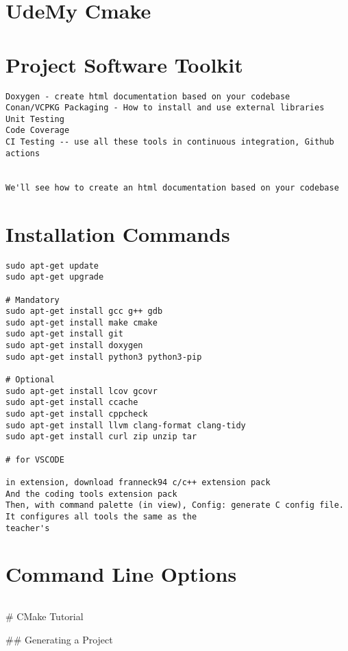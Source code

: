 \section{UdeMy Cmake}

\section{Project Software Toolkit}

\begin{verbatim}
Doxygen - create html documentation based on your codebase
Conan/VCPKG Packaging - How to install and use external libraries
Unit Testing
Code Coverage
CI Testing -- use all these tools in continuous integration, Github actions


We'll see how to create an html documentation based on your codebase
\end{verbatim}

\section{Installation Commands}

\begin{verbatim}
sudo apt-get update
sudo apt-get upgrade

# Mandatory
sudo apt-get install gcc g++ gdb
sudo apt-get install make cmake
sudo apt-get install git
sudo apt-get install doxygen
sudo apt-get install python3 python3-pip

# Optional
sudo apt-get install lcov gcovr
sudo apt-get install ccache
sudo apt-get install cppcheck
sudo apt-get install llvm clang-format clang-tidy
sudo apt-get install curl zip unzip tar

# for VSCODE

in extension, download franneck94 c/c++ extension pack
And the coding tools extension pack
Then, with command palette (in view), Config: generate C config file. It configures all tools the same as the
teacher's
\end{verbatim}


\section{Command Line Options}


\begin{verbatim}

\end{verbatim}
# CMake Tutorial

## Generating a Project

